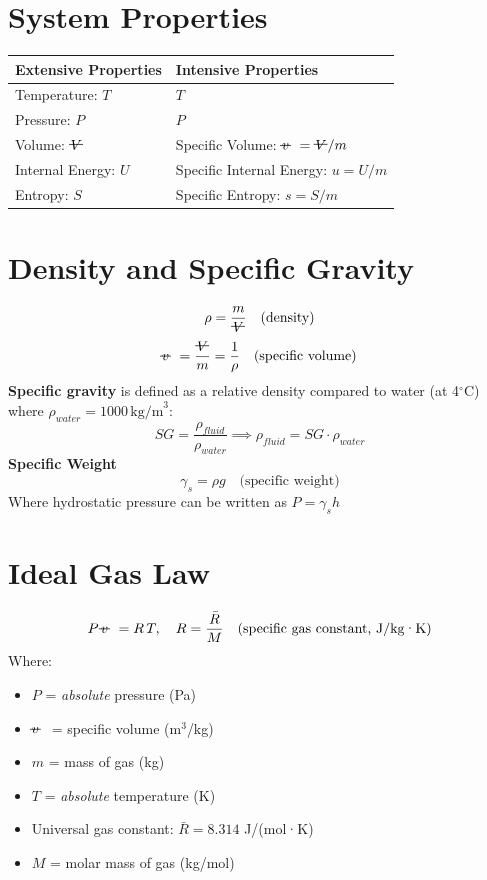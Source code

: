 \documentclass[10pt, fleqn]{article}
\newcommand{\vol}{\mathord{\text{\ooalign{\hidewidth $V$\hidewidth\cr\kern-0.5pt\raisebox{0.8ex}{\rule[0pt]{1em}{0.5pt}}}}}}
\newcommand{\svol}[1][-0.15em]{%
  \mathord{\text{\ooalign{
    $v$\cr
    \hspace{#1}\rule[0.6ex]{0.8em}{0.5pt} %
  }}}%
}
\begin{document}
\section*{System Properties}
\begin{center}
\begin{tabular}{|l|l|}
\hline
\textbf{Extensive Properties} & \textbf{Intensive Properties} \\
\hline
Temperature: $T$ & $T$ \\
Pressure: $P$ & $P$ \\
Volume: $\vol$ & Specific Volume: $\svol = \vol / m$ \\
Internal Energy: $U$ & Specific Internal Energy: $u = U / m$ \\
Entropy: $S$ & Specific Entropy: $s = S / m$ \\
\hline
\end{tabular}
\end{center}
\section*{Density and Specific Gravity}
\[\rho = \frac{m}{\vol}\quad \text{(density)}\]
\[\svol = \frac{\vol}{m} = \frac{1}{\rho} \quad \text{(specific volume)}\]
\textbf{Specific gravity} is defined as a relative density compared to water (at 4$^\circ$C) where $\rho_{water} = 1000\,\text{kg/m}^3$:
\[\boxed{SG = \frac{\rho_{fluid}}{\rho_{water}} \implies \rho_{fluid} = SG \cdot \rho_{water}}\]
\textbf{Specific Weight}
\[\gamma_s = \rho g \quad \text{(specific weight)}\]
Where hydrostatic pressure can be written as $P = \gamma_s h$
\section*{Ideal Gas Law}
\[
P \, \svol = R \, T, \quad
R = \frac{\bar{R}}{M} \quad \text{(specific gas constant, J/kg·K)}
\]
Where:
\begin{itemize}[label=\textbullet]
    \item $P$ = \textit{absolute} pressure (Pa)
    \item $\svol$ = specific volume (m$^3$/kg)
    \item $m$ = mass of gas (kg)
    \item $T$ = \textit{absolute} temperature (K)
    \item Universal gas constant: $\bar{R} = 8.314$ J/(mol·K)
    \item $M$ = molar mass of gas (kg/mol)
\end{itemize}
\end{document}
